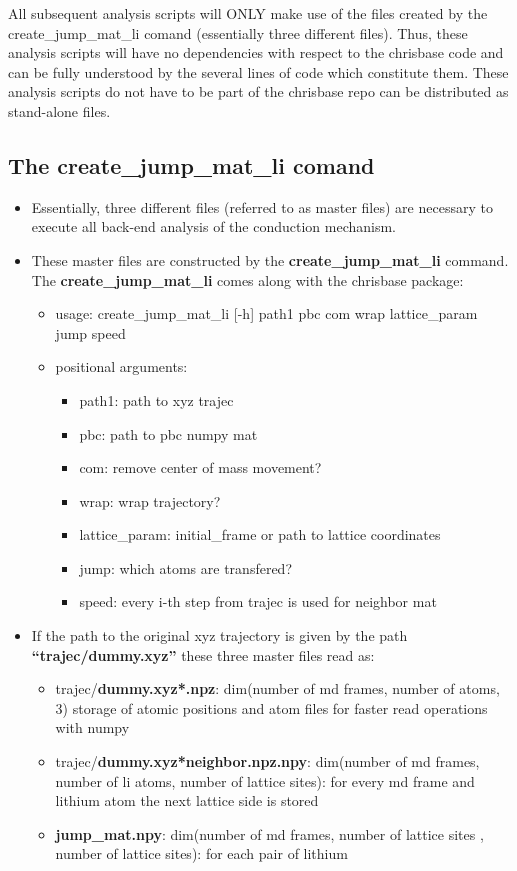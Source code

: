 \documentclass{article}
\begin{document}
All subsequent analysis scripts will ONLY make use of the files created  by the create\_jump\_mat\_li comand (essentially three different files).
%
Thus, these analysis scripts will have no dependencies with respect to the chrisbase code and can be fully understood by the several lines of code which constitute them. These analysis scripts do not have to be part of the chrisbase repo can be distributed as stand-alone files. 






\subsection{The create\_jump\_mat\_li comand}
%
\begin{itemize}
 \item Essentially, three different files (referred to as master files) are necessary to execute all back-end analysis of the conduction mechanism.
 \item These master files are constructed by the \textbf{create\_jump\_mat\_li} command. The \textbf{create\_jump\_mat\_li} comes along with the chrisbase package:
 \begin{itemize}
%
\item usage: create\_jump\_mat\_li [-h] path1 pbc com wrap lattice\_param jump speed

\item positional arguments:
 \begin{itemize}
\item  path1:          path to xyz trajec
%
 \item pbc:            path to pbc numpy mat
 \item com:            remove center of mass movement?
 \item wrap:           wrap trajectory?
\item  lattice\_param:  initial\_frame or path to lattice coordinates
\item  jump:           which atoms are transfered?
 \item speed:          every i-th step from trajec is used for neighbor mat
\end{itemize}
 \end{itemize}
 \item If the path to the original xyz trajectory is given by the path \textbf{``trajec/dummy.xyz''} these three master files read as:
\begin{itemize}
%
%
%
%
  \item  trajec/\textbf{dummy.xyz*.npz}: dim(number of md frames, number of atoms, 3) storage of atomic positions and atom files for faster read operations with numpy  
%
  \item  trajec/\textbf{dummy.xyz*neighbor.npz.npy}:  dim(number of md frames, number of li atoms, number of lattice sites): for every md frame and lithium atom the next lattice side is stored
  \item  \textbf{jump\_mat.npy}: dim(number of md frames, number of lattice sites , number of lattice sites): for each pair of lithium 
%
%
%
%
  

\end{itemize}
\end{itemize}
\end{document}
